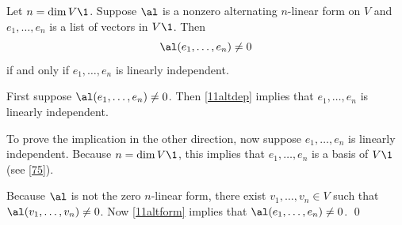{Let $n = \dim V\1$. Suppose $\al$ is a nonzero alternating $n$-linear form on $V$ and $e_1, \ldots, e_n$ is a list of vectors in $V\1$. Then
\[
\al(e_1, \ldots, e_n) \ne 0
\]
if and only if $e_1, \ldots, e_n$ is linearly independent.}

\proof
First suppose $\al(e_1, \ldots, e_n) \ne 0$. Then \ref{11altdep} implies that $e_1, \ldots, e_n$ is linearly independent.

To prove the implication in the other direction, now suppose $e_1, \ldots, e_n$ is linearly independent. Because
$n = \dim V\1$, this implies that $e_1, \ldots, e_n$ is a basis of $V\1$ (see \ref{75}).

Because $\al$ is not the zero $n$-linear form, there exist $v_1, \ldots, v_n \in V$ such that
$\al(v_1, \ldots, v_n) \ne 0$. Now \ref{11altform} implies that $\al( e_1, \ldots, e_n ) \ne 0$.
\qed

